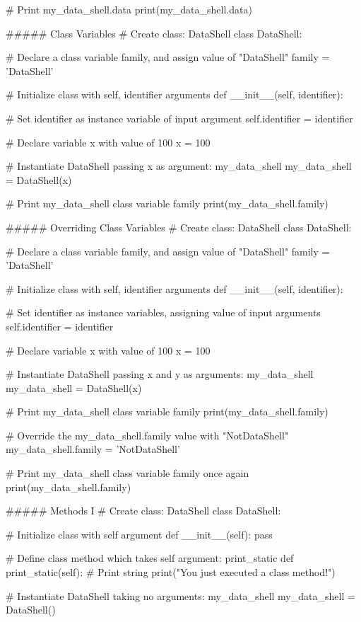 # Print my_data_shell.data
print(my_data_shell.data)


##### Class Variables
# Create class: DataShell
class DataShell:
  
    # Declare a class variable family, and assign value of "DataShell"
    family = 'DataShell'
    
    # Initialize class with self, identifier arguments
    def __init__(self, identifier):
      
        # Set identifier as instance variable of input argument
        self.identifier = identifier

# Declare variable x with value of 100
x = 100

# Instantiate DataShell passing x as argument: my_data_shell
my_data_shell = DataShell(x)

# Print my_data_shell class variable family
print(my_data_shell.family)


##### Overriding Class Variables
# Create class: DataShell
class DataShell:
  
    # Declare a class variable family, and assign value of "DataShell"
    family = 'DataShell'
    
    # Initialize class with self, identifier arguments
    def __init__(self, identifier):
      
        # Set identifier as instance variables, assigning value of input arguments
        self.identifier = identifier

# Declare variable x with value of 100
x = 100

# Instantiate DataShell passing x and y as arguments: my_data_shell
my_data_shell = DataShell(x)

# Print my_data_shell class variable family
print(my_data_shell.family)

# Override the my_data_shell.family value with "NotDataShell"
my_data_shell.family = 'NotDataShell'

# Print my_data_shell class variable family once again
print(my_data_shell.family)


##### Methods I
# Create class: DataShell
class DataShell:
  
	# Initialize class with self argument
    def __init__(self):
        pass
      
	# Define class method which takes self argument: print_static
    def print_static(self):
        # Print string
        print("You just executed a class method!")
        
# Instantiate DataShell taking no arguments: my_data_shell
my_data_shell = DataShell()

